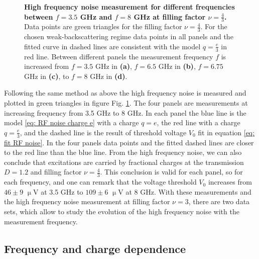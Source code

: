 \begin{figure}[hptb]
	\caption{\textbf{High frequency noise measurement for different frequencies between $f= 3.5$ GHz and $f = 8$ GHz at filling factor $\nu = \frac{4}{3}$.} Data points are green triangles for the filling factor $\nu = \frac{4}{3}$. For the chosen weak-backscattering regime data points in all panels and the fitted curve in dashed lines are consistent with the model $q = \frac{e}{3}$ in red line. Between different panels the measurement frequency $f$ is increased from $f = 3.5$ GHz in \textbf{(a)}, $f = 6.5$ GHz in \textbf{(b)}, $f = 6.75$ GHz in \textbf{(c)}, to $f = 8$ GHz in \textbf{(d)}.}
	\label{fig: RF charac at 4/3}
\end{figure}

Following the same method as above the high frequency noise is measured and plotted in green triangles in figure Fig. \ref{fig: RF charac at 4/3}.
The four panels are measurements at increasing frequency from 3.5 GHz to 8 GHz.
In each panel the blue line is the model \eqref{eq: RF noise charge e} with a charge $q = e$, the red line with a charge $q = \frac{e}{3}$, and the dashed line is the result of threshold voltage $V_{0}$ fit in equation \eqref{eq: fit RF noise}.
In the four panels data points and the fitted dashed lines are closer to the red line than the blue line.
From the high frequency noise, we can also conclude that excitations are carried by fractional charges at the transmission $D = 1.2$ and filling factor $\nu = \frac{4}{3}$.
This conclusion is valid for each panel, so for each frequency, and one can remark that the voltage threshold $V_{0}$ increases from  $46 \pm 9$ $\upmu$V at 3.5 GHz to $109 \pm 6$ $\upmu$V at 8 GHz.
With these measurements and the high frequency noise measurement at filling factor $\nu = 3$, there are two data sets, which allow to study the evolution of the high frequency noise with the measurement frequency.

\subsection{Frequency and charge dependence}

